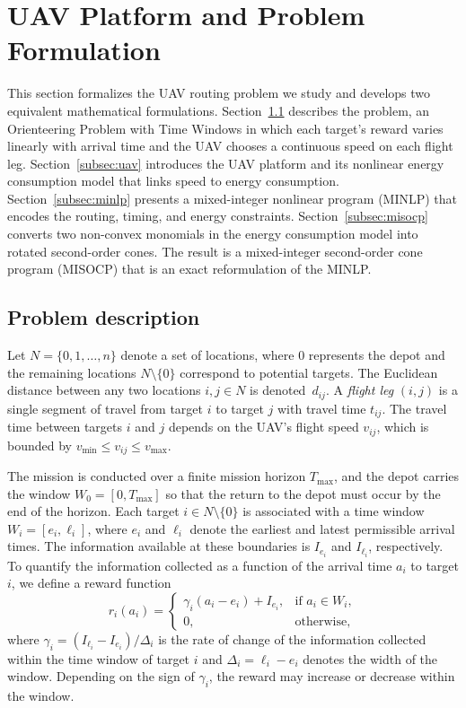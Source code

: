 \documentclass[11pt]{article}
\let\originalsubsection\subsection
\renewcommand{\subsection}{\FloatBarrier\originalsubsection}
\begin{document}
\section{UAV Platform and Problem Formulation}\label{sec:model}


This section formalizes the UAV routing problem we study and develops two equivalent mathematical formulations. Section~\ref{subsec:problem} describes the problem, an Orienteering Problem with Time Windows in which each target's reward varies linearly with arrival time and the UAV chooses a continuous speed on each flight leg. Section~\ref{subsec:uav} introduces the UAV platform and its nonlinear energy consumption model that links speed to energy consumption. Section~\ref{subsec:minlp} presents a mixed-integer nonlinear program (MINLP) that encodes the routing, timing, and energy constraints. Section~\ref{subsec:misocp} converts two non-convex monomials in the energy consumption model into rotated second-order cones. The result is a mixed-integer second-order cone program (MISOCP) that is an exact reformulation of the MINLP. 
\subsection{Problem description}\label{subsec:problem}

Let $N = \{0, 1, \dots, n\}$ denote a set of locations, where $0$ represents the depot and the remaining locations $N \setminus \{0\}$ correspond to potential targets. The Euclidean distance between any two locations $i, j \in N$ is denoted~$d_{ij}$. A \emph{flight leg} $(i,j)$ is a single segment of travel from target $i$ to target $j$ with travel time $t_{ij}$. The travel time between targets $i$ and $j$ depends on the UAV's flight speed $v_{ij}$, which is bounded by $v_{\min} \le v_{ij} \le v_{\max}$. 

The mission is conducted over a finite mission horizon $T_{\max}$, and the depot carries the window $W_0 = [0, T_{\max}]$ so that the return to the depot must occur by the end of the horizon. Each target $i \in N \setminus \{0\}$ is associated with a time window $W_i = [e_i, \ell_i]$, where $e_i$ and $\ell_i$ denote the earliest and latest permissible arrival times. The information available at these boundaries is $I_{e_i}$ and $I_{\ell_i}$, respectively. To quantify the information collected as a function of the arrival time $a_i$ to target $i$, we define a reward function
\[
r_i(a_i) =
\begin{cases}
  \gamma_i (a_i - e_i) + I_{e_i},
        & \text{if } a_i \in W_i, \\
    0, & \text{otherwise,}
\end{cases}
\]
where $\gamma_i = ({I_{\ell_i} - I_{e_i}})/\Delta_i$ is the rate of change of the information collected within the time window of target $i$ and $\Delta_i = \ell_i - e_i$ denotes the width of the window. Depending on the sign of $\gamma_i$, the reward may increase or decrease within the window.
\end{document}
